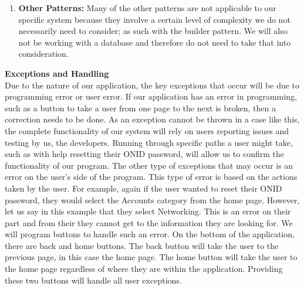 \documentclass[12pt, letterpaper]{article}
\begin{document}
\begin{enumerate}
		\item \textbf{Other Patterns:}
	Many of the other patterns are not applicable to our specific system because they involve a certain level of complexity we do not necessarily need to consider; as such with the builder pattern.  We will also not be working with a database and therefore do not need to take that into consideration. 
\end{enumerate}		
\textbf{Exceptions and Handling}
	\\Due to the nature of our application, the key exceptions that occur will be due to programming error or user error. If our application has an error in programming, such as a button to take a user from one page to the next is broken, then a correction needs to be done. As an exception cannot be thrown in a case like this, the complete functionality of our system will rely on users reporting issues and testing by us, the developers. Running through specific paths a user might take, such as with help resetting their ONID password, will allow us to confirm the functionality of our program. 
	The other type of exceptions that may occur is an error on the user’s side of the program. This type of error is based on the actions taken by the user. For example, again if the user wanted to reset their ONID password, they would select the Accounts category from the home page. However, let us say in this example that they select Networking. This is an error on their part and from their they cannot get to the information they are looking for. We will program buttons to handle such an error. On the bottom of the application, there are back and home buttons. The back button will take the user to the previous page, in this case the home page. The home button will take the user to the home page regardless of where they are within the application. Providing these two buttons will handle all user exceptions.
	
\end{document}
